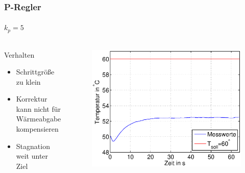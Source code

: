 \begin{frame}
    \frametitle{P-Regler}
    \framesubtitle{$k_p=5$}
    \begin{columns}[c]
            \begin{block}{Verhalten}
                \begin{itemize}
                    \item Schrittgröße zu klein
                    \item Korrektur kann nicht für Wärmeabgabe kompensieren
                    \item Stagnation weit unter Ziel
                \end{itemize}
            \end{block}
        \begin{figure}[H]
        \begin{center}
                \includegraphics[scale=0.4]{./img/plots/Auf_2_b_0_1.eps}
        \end{center}
        \end{figure}
     \end{columns}
\end{frame}
